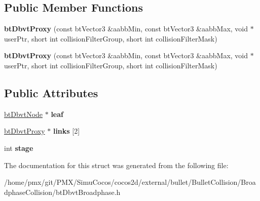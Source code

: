 \subsection*{Public Member Functions}
\begin{DoxyCompactItemize}
\item 
\mbox{\label{structbtDbvtProxy_a5b732547db62d49cd410578ba8efbbd4}} 
{\bfseries bt\+Dbvt\+Proxy} (const bt\+Vector3 \&aabb\+Min, const bt\+Vector3 \&aabb\+Max, void $\ast$user\+Ptr, short int collision\+Filter\+Group, short int collision\+Filter\+Mask)
\item 
\mbox{\label{structbtDbvtProxy_a5b732547db62d49cd410578ba8efbbd4}} 
{\bfseries bt\+Dbvt\+Proxy} (const bt\+Vector3 \&aabb\+Min, const bt\+Vector3 \&aabb\+Max, void $\ast$user\+Ptr, short int collision\+Filter\+Group, short int collision\+Filter\+Mask)
\end{DoxyCompactItemize}
\subsection*{Public Attributes}
\begin{DoxyCompactItemize}
\item 
\mbox{\label{structbtDbvtProxy_a590c0684ad99105d537d983f7a184a6a}} 
\hyperlink{structbtDbvtNode}{bt\+Dbvt\+Node} $\ast$ {\bfseries leaf}
\item 
\mbox{\label{structbtDbvtProxy_ac532e5f37b2d5b60d34f88032c730f02}} 
\hyperlink{structbtDbvtProxy}{bt\+Dbvt\+Proxy} $\ast$ {\bfseries links} \mbox{[}2\mbox{]}
\item 
\mbox{\label{structbtDbvtProxy_a103fd247822f6cc910ef02a9bb7e7b02}} 
int {\bfseries stage}
\end{DoxyCompactItemize}


The documentation for this struct was generated from the following file\+:\begin{DoxyCompactItemize}
\item 
/home/pmx/git/\+P\+M\+X/\+Simu\+Cocos/cocos2d/external/bullet/\+Bullet\+Collision/\+Broadphase\+Collision/bt\+Dbvt\+Broadphase.\+h\end{DoxyCompactItemize}
